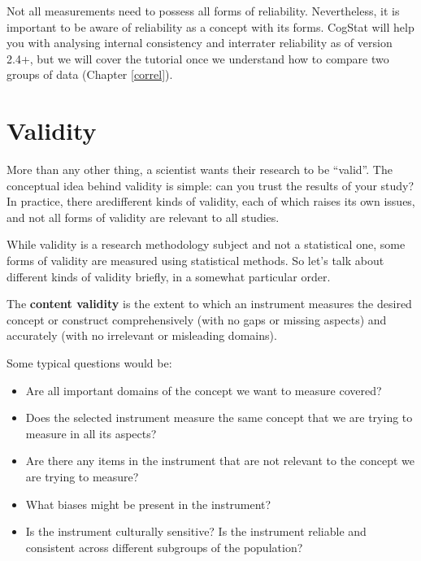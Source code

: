 \documentclass[
  11pt,
  a4paper,
  twoside,symmetric,openright]{book}
\providecommand{\tightlist}{%
  \setlength{\itemsep}{0pt}\setlength{\parskip}{0pt}}
\theoremstyle{break}
\theoremstyle{break}
\begin{document}
Not all measurements need to possess all forms of reliability. Nevertheless, it is important to be aware of reliability as a concept with its forms. CogStat will help you with analysing internal consistency and interrater reliability as of version 2.4+, but we will cover the tutorial once we understand how to compare two groups of data (Chapter \ref{correl}).

\section{Validity}\label{validity}

More than any other thing, a scientist wants their research to be ``valid''. The conceptual idea behind validity is simple: can you trust the results of your study? In practice, there aredifferent kinds of validity, each of which raises its own issues, and not all forms of validity are relevant to all studies.

While validity is a research methodology subject and not a statistical one, some forms of validity are measured using statistical methods. So let's talk about different kinds of validity briefly, in a somewhat particular order.

\begin{definition}
\protect\hypertarget{def:defcontentvalidity}{}\label{def:defcontentvalidity}The \textbf{content validity} is the extent to which an instrument measures the desired concept or construct comprehensively (with no gaps or missing aspects) and accurately (with no irrelevant or misleading domains).
\end{definition}

Some typical questions would be:

\begin{itemize}
\tightlist
\item
  Are all important domains of the concept we want to measure covered?
\item
  Does the selected instrument measure the same concept that we are trying to measure in all its aspects?
\item
  Are there any items in the instrument that are not relevant to the concept we are trying to measure?
\item
  What biases might be present in the instrument?
\item
  Is the instrument culturally sensitive? Is the instrument reliable and consistent across different subgroups of the population?
\end{itemize}
\end{document}

